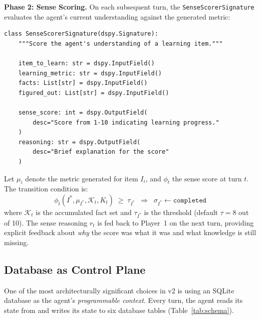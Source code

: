 \documentclass[11pt,letterpaper]{article}
\begin{document}
\clearpage
\textbf{Phase 2: Sense Scoring.} On each subsequent turn, the \texttt{SenseScorerSignature} evaluates the agent's current understanding against the generated metric:
\begin{lstlisting}[caption={Sense scoring via DSPy.},label=lst:sense]
class SenseScorerSignature(dspy.Signature):
    """Score the agent's understanding of a learning item."""

    item_to_learn: str = dspy.InputField()
    learning_metric: str = dspy.InputField()
    facts: List[str] = dspy.InputField()
    figured_out: List[str] = dspy.InputField()

    sense_score: int = dspy.OutputField(
        desc="Score from 1-10 indicating learning progress."
    )
    reasoning: str = dspy.OutputField(
        desc="Brief explanation for the score"
    )
\end{lstlisting}

Let $\mu_i$ denote the metric generated for item $I_i$, and $\phi_t$ the sense score at turn $t$. The transition condition is:
\begin{equation}
  \phi_t(I^*, \mu_{I^*}, \mathcal{K}_t, K_t) \;\geq\; \tau_{I^*} \;\;\Longrightarrow\;\; \sigma_{I^*} \leftarrow \texttt{completed}
  \label{eq:transition}
\end{equation}
where $\mathcal{K}_t$ is the accumulated fact set and $\tau_{I^*}$ is the threshold (default $\tau = 8$ out of 10). The sense reasoning $r_t$ is fed back to Player~1 on the next turn, providing explicit feedback about \emph{why} the score was what it was and what knowledge is still missing.

\subsection{Database as Control Plane}
\label{sec:database}

One of the most architecturally significant choices in v2 is using an SQLite database as the agent's \emph{programmable context}. Every turn, the agent reads its state from and writes its state to six database tables (Table~\ref{tab:schema}).
\end{document}
